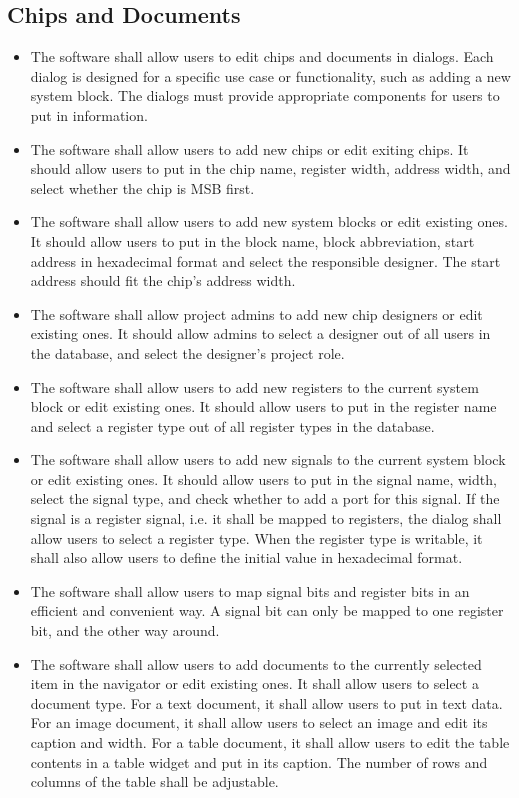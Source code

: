 \subsection{Chips and Documents}
\begin{itemize}
\item The software shall allow users to edit chips and documents in dialogs. Each dialog is designed for a specific use case or functionality, such as adding a new system block. The dialogs must provide appropriate components for users to put in information.
\item The software shall allow users to add new chips or edit exiting chips. It should allow users to put in the chip name, register width, address width, and select whether the chip is MSB first.
\item The software shall allow users to add new system blocks or edit existing ones. It should allow users to put in the block name, block abbreviation, start address in hexadecimal format and select the responsible designer. The start address should fit the chip's address width.
\item The software shall allow project admins to add new chip designers or edit existing ones. It should allow admins to select a designer out of all users in the database, and select the designer's project role.
\item The software shall allow users to add new registers to the current system block or edit existing ones. It should allow users to put in the register name and select a register type out of all register types in the database.
\item The software shall allow users to add new signals to the current system block or edit existing ones. It should allow users to put in the signal name, width, select the signal type, and check whether to add a port for this signal. If the signal is a register signal, i.e. it shall be mapped to registers, the dialog shall allow users to select a register type. When the register type is writable, it shall also allow users to define the initial value in hexadecimal format.
\item The software shall allow users to map signal bits and register bits in an efficient and convenient way. A signal bit can only be mapped to one register bit, and the other way around. 
\item The software shall allow users to add documents to the currently selected item in the navigator or edit existing ones. It shall allow users to select a document type. For a text document, it shall allow users to put in text data. For an image document, it shall allow users to select an image and edit its caption and width. For a table document, it shall allow users to edit the table contents in a table widget and put in its caption. The number of rows and columns of the table shall be adjustable.

\end{itemize}
